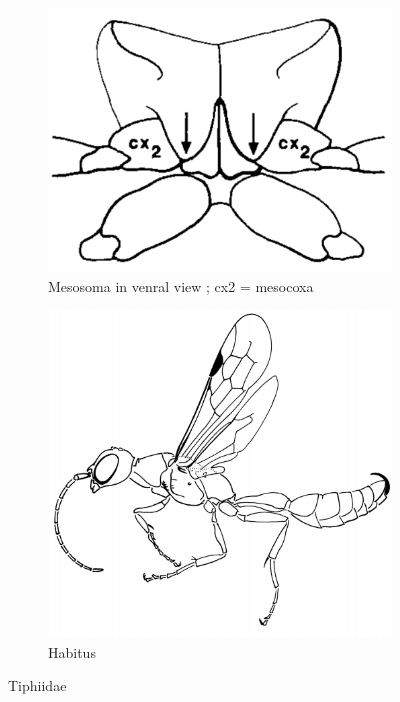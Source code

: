 \documentclass[letterpaper, 11pt]{article}
\begin{document}
\begin{figure}[ht!]
    \centering
    \begin{subfigure}[ht!]{0.4\textwidth}
        \includegraphics[width=\textwidth]{TiphiidMesosoma}
        \caption{Mesosoma in venral view \citep[][pg. 163]{goulet1993hymenoptera}; cx2 = mesocoxa}
        \label{fig:tiphiid1}
    \end{subfigure}
    \qquad
    \begin{subfigure}[ht!]{0.45\textwidth}
        \includegraphics[width=\textwidth]{TiphiidHabitus}
        \caption{Habitus \citep[][Fig. 49]{goulet1993hymenoptera}}
        \label{fig:tiphiid2}
    \end{subfigure}
    \caption{Tiphiidae}\label{fig:tiphiidae}
\end{figure}
\end{document}
